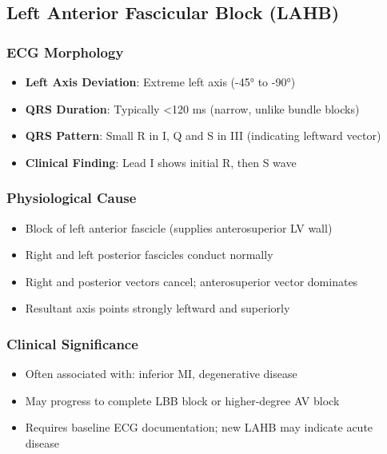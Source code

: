 \documentclass[11pt, a4paper]{article}
\begin{document}
\subsection{Left Anterior Fascicular Block (LAHB)}

\subsubsection{ECG Morphology}
\begin{itemize}
    \item \textbf{Left Axis Deviation}: Extreme left axis (-45° to -90°)
    \item \textbf{QRS Duration}: Typically <120 ms (narrow, unlike bundle blocks)
    \item \textbf{QRS Pattern}: Small R in I, Q and S in III (indicating leftward vector)
    \item \textbf{Clinical Finding}: Lead I shows initial R, then S wave
\end{itemize}

\subsubsection{Physiological Cause}
\begin{itemize}
    \item Block of left anterior fascicle (supplies anterosuperior LV wall)
    \item Right and left posterior fascicles conduct normally
    \item Right and posterior vectors cancel; anterosuperior vector dominates
    \item Resultant axis points strongly leftward and superiorly
\end{itemize}

\subsubsection{Clinical Significance}
\begin{itemize}
    \item Often associated with: inferior MI, degenerative disease
    \item May progress to complete LBB block or higher-degree AV block
    \item Requires baseline ECG documentation; new LAHB may indicate acute disease
\end{itemize}
\end{document}

